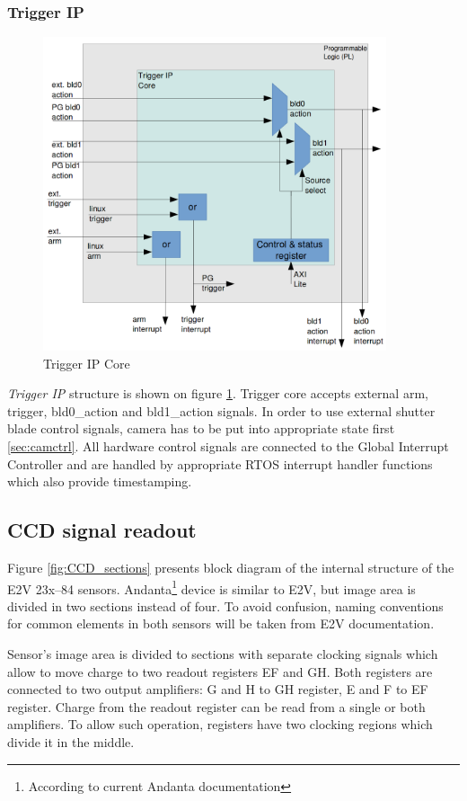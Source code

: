 \subsubsection{Trigger IP}
\begin{figure}[H]
\centering
\includegraphics[width=0.9\textwidth]{pict/trigger_ip.png}
\caption{Trigger IP Core}
\label{fig:trigger_core}
\end{figure}

\emph{Trigger IP} structure is shown on figure \ref{fig:trigger_core}. Trigger core accepts external arm, trigger, bld0\_action and bld1\_action signals. In order to use external shutter blade control signals, camera has to be put into appropriate state first \ref{sec:camctrl}. All hardware control signals are connected to the Global Interrupt Controller and are handled by appropriate RTOS interrupt handler functions which also provide timestamping. 


\subsection{CCD signal readout}
\label{sec:ccdreadout}
Figure \ref{fig:CCD_sections} presents block diagram of the internal structure of the E2V 23x--84 sensors. Andanta\footnote{According to current Andanta documentation} device is similar to E2V, but image area is divided in two sections instead of four. To avoid confusion, naming conventions for common elements in both sensors will be taken from E2V documentation. 

Sensor's image area is divided to sections with separate clocking signals which allow to move charge to two readout registers EF and GH. Both registers are connected to two output amplifiers: G and H to GH register, E and F to EF register. Charge from the readout register can be read from a single or both amplifiers. To allow such operation, registers have two clocking regions which divide it in the middle. 

